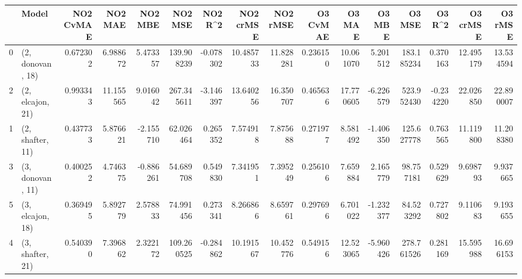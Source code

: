 \begin{tabular}{llrrrrrrrrrrrrrr}
\toprule
{} &             Model &  NO2 CvMAE &    NO2 MAE &   NO2 MBE &     NO2 MSE &   NO2 R\textasciicircum2 &  NO2 crMSE &   NO2 rMSE &  O3 CvMAE &     O3 MAE &    O3 MBE &      O3 MSE &    O3 R\textasciicircum2 &   O3 crMSE &    O3 rMSE \\
\midrule
0 &  (2, donovan, 18) &   0.672302 &   6.988672 &  5.473357 &  139.908239 & -0.078302 &  10.485733 &  11.828281 &  0.236150 &  10.061070 &  5.201512 &  183.185234 &  0.370163 &  12.495179 &  13.534594 \\
2 &  (2, elcajon, 21) &   0.993343 &  11.155565 &  9.016042 &  267.345611 & -3.146397 &  13.640256 &  16.350707 &  0.465636 &  17.770605 & -6.226579 &  523.952430 & -0.234220 &  22.026850 &  22.890007 \\
1 &  (2, shafter, 11) &   0.437733 &   5.876621 & -2.155710 &   62.026464 &  0.265352 &   7.574918 &   7.875688 &  0.271977 &   8.581492 & -1.406350 &  125.627778 &  0.763565 &  11.119800 &  11.208380 \\
3 &  (3, donovan, 11) &   0.400252 &   4.746375 & -0.886261 &   54.689708 &  0.549830 &   7.341951 &   7.395249 &  0.256106 &   7.659884 &  2.165779 &   98.757181 &  0.529629 &   9.698793 &   9.937665 \\
5 &  (3, elcajon, 18) &   0.369495 &   5.892779 &  2.578833 &   74.991456 &  0.273341 &   8.266866 &   8.659761 &  0.297696 &   6.701022 & -1.232377 &   84.523292 &  0.727802 &   9.110683 &   9.193655 \\
4 &  (3, shafter, 21) &   0.540390 &   7.396862 &  2.322172 &  109.260525 & -0.284862 &  10.191567 &  10.452776 &  0.549156 &  12.523065 & -5.960426 &  278.761526 &  0.281169 &  15.595988 &  16.696153 \\
\bottomrule
\end{tabular}
